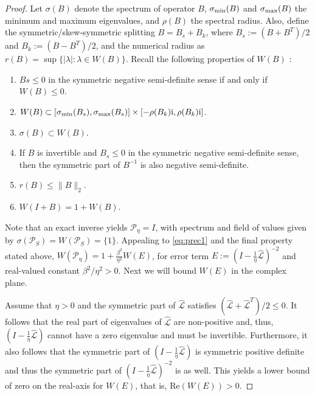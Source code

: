 \documentclass[review]{siamart}
\begin{document}
\begin{proof}
Let $\sigma(B)$ denote the spectrum of operator $B$, $\sigma_{\textnormal{min}}(B)$
and $\sigma_{\textnormal{max}}(B)$ the minimum and maximum eigenvalues, and $\rho(B)$
the spectral radius. Also, define the symmetric/skew-symmetric splitting
$B = B_s + B_k$, where $B_s := (B+B^T)/2$ and $B_k := (B - B^T)/2$, and the numerical
radius as $r(B) = \sup \{ |\lambda| : \lambda \in W(B) \}$. Recall
the following properties of $W(B)$ \cite{gustafson1997numerical,mees1979domains}:
%
\begin{enumerate}
	\item $Bs \leq 0$ in the symmetric negative semi-definite sense
	if and only if $W(B) \leq 0$.

	\item $W(B)\subset [\sigma_{\textnormal{min}}(B_s), \sigma_{\textnormal{max}}(B_s)] \times
	[-\rho(B_k)\mathrm{i}, \rho(B_k)\mathrm{i}]$.

	\item $\sigma(B) \subset W(B)$.

	\item If $B$ is invertible and $B_s \leq 0$ in the symmetric negative semi-definite
	sense, then the symmetric part of $B^{-1}$ is also negative semi-definite.

	\item $r(B) \leq \|B\|_2$.

	\item $W(I + B) = 1 + W(B)$.
\end{enumerate}
%
Note that an exact inverse yields $\mathcal{P}_\eta = I$, with spectrum
and field of values given by $\sigma(\mathcal{P}_S) = W(\mathcal{P}_S) = \{1\}$.
Appealing to \eqref{eq:prec1} and the final property stated above, $W(\mathcal{P}_\eta)
= 1 + \tfrac{\beta^2}{\eta^2}W(E)$, for error term $E := (I - \tfrac{1}{\eta}\widehat{\mathcal{L}})^{-2}$
and real-valued constant $\beta^2/\eta^2 > 0$. Next we will bound $W(E)$ in the complex plane.

Assume that $\eta > 0$ and the symmetric part of $\widehat{\mathcal{L}}$ satisfies
$(\widehat{\mathcal{L}}+\widehat{\mathcal{L}}^T)/2 \leq 0$.
It follows that the real part of eigenvalues of $\widehat{\mathcal{L}}$ are non-positive and,
thus, $(I - \tfrac{1}{\eta}\widehat{\mathcal{L}})$ cannot have a zero eigenvalue and must be
invertible. Furthermore, it also follows that the symmetric part of
$(I - \tfrac{1}{\eta}\widehat{\mathcal{L}})$ is symmetric positive definite and thus
the symmetric part of $(I - \tfrac{1}{\eta}\widehat{\mathcal{L}})^{-2}$ is as well.
This yields a lower bound of zero on the real-axis for $W(E)$, that is,
Re$(W(E)) > 0$.


\end{proof}
\end{document}
